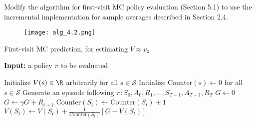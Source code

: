 
\begin{exercise}[Exercise 5.9]

Modify the algorithm for first-visit MC policy evaluation (Section 5.1)
to use the incremental implementation for sample averages described in
Section 2.4.

\begin{figure}[H]
    \centering
    \texttt{[image: alg\_4.2.png]}
\end{figure}
  
\end{exercise}
  
  
\begin{solution}

\phantom{}
  
\begin{algorithm}
    \caption{First-visit MC prediction, for estimating $V \approx v_\pi$}
    \hspace*{\algorithmicindent} \textbf{Input:} a policy $\pi$ to be evaluated
    \begin{algorithmic}[1]
      \State Initialize $V(s) \in \R$ arbitrarily for all $s \in \mathcal{S}$
      \State Initialize Counter$(s) \leftarrow 0$ for all $s \in \mathcal{S}$
        \State Generate an episode following $\pi: S_0,A_0,R_1,\dots,S_{T-1},A_{T-1},R_T$
        \State $G \leftarrow 0$
        \State $G \leftarrow \gamma G + R_{t+1}$
        \State Counter$(S_t) \leftarrow \text{Counter}(S_t) + 1$
        \State $V(S_t) \leftarrow V(S_t) +  \frac{1}{\text{Counter}(S_t)}[G - V(S_t)]$
        \EndIf
        \EndFor
      \EndWhile
    \end{algorithmic}
\end{algorithm}
  
\end{solution}
  
  